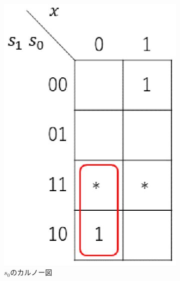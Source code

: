 \documentclass{jsarticle}
\begin{document}
\begin{description}
\begin{description}
\begin{figure}[H]
\begin{subfigure}{0.2\columnwidth}
                    \includegraphics[width=\columnwidth]{fig_2_s0.eps}
                    \caption{$s_0$のカルノー図}
                    \label{fig2_s0}
                \end{subfigure}
                \begin{subfigure}{0.2\columnwidth}
                    \centering

\end{subfigure}
\end{figure}
\end{description}
\end{description}
\end{document}
